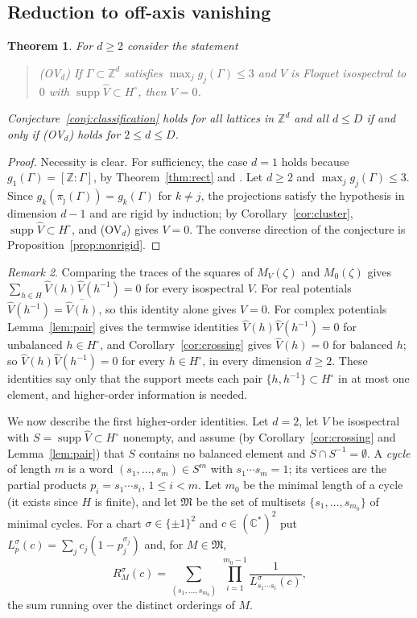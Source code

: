 \documentclass[11pt,reqno]{amsart}
\newtheorem{theorem}{Theorem}[section]
\theoremstyle{definition}
\theoremstyle{remark}
\newtheorem{remark}[theorem]{Remark}
\newcommand{\C}{\mathbb C}
\newcommand{\Z}{\mathbb Z}
\DeclareMathOperator{\supp}{supp}
\begin{document}
\subsection{Reduction to off-axis vanishing}

\begin{theorem}\label{thm:reduction}
For $d\ge2$ consider the statement
\begin{quote}
\textup{(OV$_d$)} If $\Gamma\subset\Z^d$ satisfies $\max_jg_j(\Gamma)\le3$ and $V$
is Floquet isospectral to $0$ with $\supp\widehat V\subset H^\circ$, then $V=0$.
\end{quote}
Conjecture~\ref{conj:classification} holds for all lattices in $\Z^d$ and all
$d\le D$ if and only if \textup{(OV$_d$)} holds for $2\le d\le D$.
\end{theorem}

\begin{proof}
Necessity is clear.  For sufficiency, the case $d=1$ holds because
$g_1(\Gamma)=[\Z:\Gamma]$, by Theorem~\ref{thm:rect} and \cite{CFK2026}.  Let
$d\ge2$ and $\max_jg_j(\Gamma)\le3$.  Since
$g_k(\pi_{\hat\jmath}(\Gamma))=g_k(\Gamma)$ for $k\ne j$, the projections satisfy the
hypothesis in dimension $d-1$ and are rigid by induction; by
Corollary~\ref{cor:cluster}, $\supp\widehat V\subset H^\circ$, and (OV$_d$) gives
$V=0$.  The converse direction of the conjecture is Proposition~\ref{prop:nonrigid}.
\end{proof}

\begin{remark}\label{rem:liu}
Comparing the traces of the squares of $M_V(\zeta)$ and $M_0(\zeta)$ gives
$\sum_{h\in H}\widehat V(h)\widehat V(h^{-1})=0$ for every isospectral $V$.  For
real potentials $\widehat V(h^{-1})=\overline{\widehat V(h)}$, so this identity
alone gives $V=0$.  For complex potentials Lemma~\ref{lem:pair} gives the
termwise identities $\widehat V(h)\widehat V(h^{-1})=0$ for unbalanced
$h\in H^\circ$, and Corollary~\ref{cor:crossing} gives $\widehat V(h)=0$ for
balanced $h$; so $\widehat V(h)\widehat V(h^{-1})=0$ for every $h\in H^\circ$, in
every dimension $d\ge2$.  These identities say only that the support meets each
pair $\{h,h^{-1}\}\subset H^\circ$ in at most one element, and higher-order
information is needed.
\end{remark}

We now describe the first higher-order identities.  Let $d=2$, let $V$ be
isospectral with $S=\supp\widehat V\subset H^\circ$ nonempty, and assume (by
Corollary~\ref{cor:crossing} and Lemma~\ref{lem:pair}) that $S$ contains no
balanced element and $S\cap S^{-1}=\emptyset$.  A \emph{cycle} of length $m$
is a word $(s_1,\dots,s_m)\in S^m$ with $s_1\cdots s_m=1$; its vertices are the
partial products $p_i=s_1\cdots s_i$, $1\le i<m$.  Let $m_0$ be the minimal
length of a cycle (it exists since $H$ is finite), and let $\mathfrak M$ be the
set of multisets $\{s_1,\dots,s_{m_0}\}$ of minimal cycles.  For a chart
$\sigma\in\{\pm1\}^2$ and $c\in(\C^*)^2$ put
$L^\sigma_p(c)=\sum_jc_j(1-p_j^{\sigma_j})$ and, for $M\in\mathfrak M$,
\[
 R^\sigma_M(c)=\sum_{(s_1,\dots,s_{m_0})}\ \prod_{i=1}^{m_0-1}\frac1{L^\sigma_{s_1\cdots s_i}(c)},
\]
the sum running over the distinct orderings of $M$.
\end{document}
